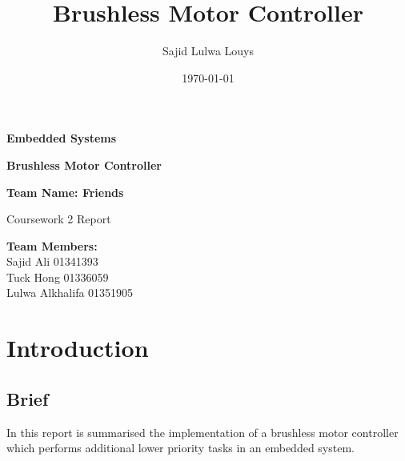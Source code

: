 \documentclass{article}
\title{Brushless Motor Controller}
\author{Sajid Lulwa Louys}
\date{\today}
\begin{document}
\begin{titlepage}
    \begin{center}
        \vspace*{1cm}

        \Huge
        \textbf{Embedded Systems}

        \vspace{0.5cm}
        \LARGE
        \textbf{Brushless Motor Controller}

        \vspace{1.5cm}

        \textbf{Team Name: Friends}\\

        \vfill

        Coursework 2 Report\\


        \vspace{0.8cm}


        \Large
        \textbf{Team Members:}\\
        Sajid Ali 01341393\\
        Tuck Hong 01336059\\
        Lulwa Alkhalifa 01351905 \\

    \end{center}
\end{titlepage}


\tableofcontents
\thispagestyle{empty} %
\clearpage

\setcounter{page}{1}

\section{Introduction}
\subsection{Brief}
\noindent
In this report is summarised the implementation of a brushless motor controller which performs additional lower priority tasks in an embedded system.
\end{document}
